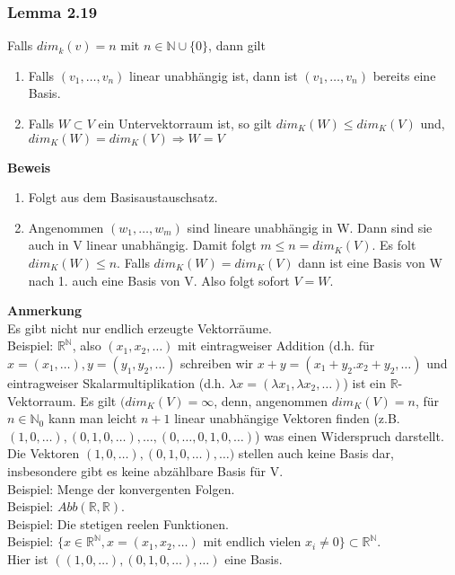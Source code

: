 \documentclass{scrartcl}
\newcommand{\lb}{\lambda}
\newcommand{\R}{\mathbb{R}}
\newcommand{\N}{\mathbb{N}}
\newcommand{\mR}{\(\mathbb{R}\)}
\begin{document}
\subsubsection{Lemma 2.19}
Falls \(dim_k(v) = n\) mit \(n \in \N \cup \{0\}\), dann gilt
\begin{enumerate}
\item{Falls \((v_1, \dots, v_n)\) linear unabh\"angig ist, dann ist \((v_1, \dots, v_n)\) bereits eine Basis.}
\item{Falls \(W \subset V\) ein Untervektorraum ist, so gilt \(dim_K(W) \le dim_K(V)\) und, \(dim_K(W) = dim_K(V) \Rightarrow W = V\)}
\end{enumerate}
\textbf{Beweis}
\begin{enumerate}
\item{Folgt aus dem Basisaustauschsatz.}
\item{Angenommen \((w_1, \dots, w_m)\) sind lineare unabh\"angig in W. Dann sind sie auch in V linear unabh\"angig. Damit folgt \(m \le n = dim_K(V)\). Es folt \(dim_K(W) \le n\). Falls \(dim_K(W) = dim_K(V)\) dann ist eine Basis von W nach 1. auch eine Basis von V. Also folgt sofort \(V = W\).}
\end{enumerate}
\textbf{Anmerkung}\\
Es gibt nicht nur endlich erzeugte Vektorr\"aume.\\
Beispiel: \(\R^\N\), also \((x_1, x_2, \dots)\) mit eintragweiser Addition (d.h. f\"ur \(x = (x_1, \dots), y = (y_1, y_2, \dots)\) schreiben wir \(x + y = (x_1 + y_2. x_2 + y_2, \dots)\) und eintragweiser Skalarmultiplikation (d.h. \(\lb x = (\lb x_1, \lb x_2, \dots)\)) ist ein \mR -Vektorraum. Es gilt \((dim_K(V) = \infty\), denn, angenommen \(dim_K(V) = n\), f\"ur \(n \in \N_0\) kann man leicht \(n + 1\) linear unabh\"angige Vektoren finden (z.B. \((1, 0, \dots), (0, 1, 0, \dots), \dots, (0, \dots, 0, 1, 0, \dots)\)) was einen Widerspruch darstellt.\\
Die Vektoren \((1, 0, \dots), (0, 1, 0, \dots), \dots)\) stellen auch keine Basis dar, insbesondere gibt es keine abz\"ahlbare Basis f\"ur V.\\
Beispiel: Menge der konvergenten Folgen.\\
Beispiel: \(Abb(\R, \R)\).\\
Beispiel: Die stetigen reelen Funktionen.\\
Beispiel: \(\{x \in \R^\N, x = (x_1, x_2, \dots)\) mit endlich vielen \(x_i \neq 0\} \subset \R^\N\).\\
Hier ist \(((1, 0, \dots), (0, 1, 0, \dots), \dots)\) eine Basis.
\end{document}
